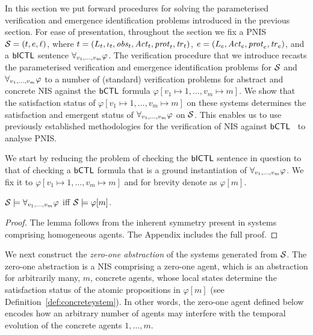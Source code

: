 In this section we put forward procedures for solving the parameterised
verification and emergence identification problems introduced in the previous
section. For ease of presentation, throughout the section we fix a PNIS
$\mathcal S = \left ( t, e, \ell \right )$, where
${t} = \left ( L_{t}, \iota_{t}, \mathit{obs}_{t}, \mathit{Act}_{t}, \mathit{prot}_{t}, \mathit{tr}_{t}  \right )$,
${e} = \left ( L_{e}, \mathit{Act}_{e}, \mathit{prot}_{e}, \mathit{tr}_{e}  \right )$, and a $\sf{bICTL}$ sentence
$\forall_{v_1,\ldots,v_m} \varphi$. The verification procedure that we introduce recasts the
parameterised verification and emergence identification problems for $\mathcal S$
and $\forall_{v_1,\ldots,v_m} \varphi$ to a number of (standard) verification problems for abstract
and concrete NIS against the $\sf{bCTL}$ formula
$\varphi[v_1 \mapsto 1, \ldots, v_m \mapsto m]$.  We show that the satisfaction
status of $\varphi[v_1 \mapsto 1, \ldots, v_m \mapsto m]$ on these systems
determines the satisfaction and emergent status of
$\forall_{v_1,\ldots,v_m} \varphi$ on $\mathcal S$. This enables us to use previously established
methodologies for the verification of NIS against $\sf{bCTL}$~\cite{Akintunde+20b}
to analyse PNIS.


We start by reducing the problem of checking the $\sf{bICTL}$ sentence in
question to that of checking a $\sf{bCTL}$ formula that is a ground
instantiation of $\forall_{v_1,\ldots,v_m} \varphi$.  We fix it to
$\varphi[v_1 \mapsto 1, \ldots, v_m \mapsto m]$ and for brevity denote
as $\varphi[m]$.


\begin{lemma}
\label{lemma:symmetry}
$\mathcal S \models \forall_{v_1,\ldots,v_m} \varphi$ iff $\mathcal S \models \varphi[m]$.
\end{lemma}
\begin{proof}
The lemma follows from the inherent symmetry present in systems comprising
homogeneous agents. The Appendix includes the full proof.
\end{proof}

We next construct the \emph{zero-one abstraction} of the systems generated from
$\mathcal S$. The zero-one abstraction is a NIS comprising a zero-one agent, which
is an abstraction for arbitrarily many, $m$, concrete agents, whose local
states determine the satisfaction status of the atomic propositions in
$\varphi[m]$ (see Definition~\ref{def:concreteystem}). %
In other words, the zero-one agent defined below encodes how an arbitrary
number of agents may interfere with the temporal evolution of the concrete
agents $1, \ldots, m$.

